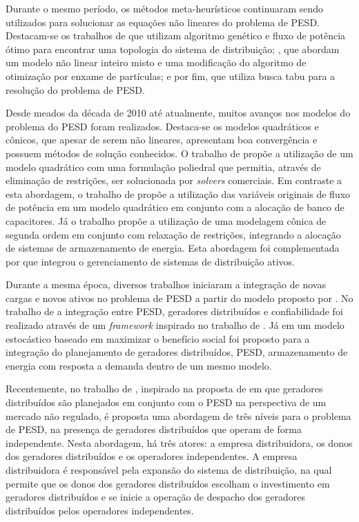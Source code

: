 Durante o mesmo período, os métodos meta-heurísticos continuaram sendo utilizados para solucionar as equações não lineares do problema de \ac{PESD}. Destacam-se os trabalhos de  que utilizam algoritmo genético e fluxo de potência ótimo para encontrar uma topologia do sistema de distribuição; , que abordam um modelo não linear inteiro misto e uma modificação do algoritmo de otimização por enxame de partículas; e por fim,  que utiliza busca tabu para a resolução do problema de \ac{PESD}.


Desde meados da década de 2010 até atualmente, muitos avanços nos modelos do problema do \ac{PESD} foram realizados. Destaca-se os modelos quadráticos e cônicos, que apesar de serem não lineares, apresentam boa convergência e possuem métodos de solução conhecidos. O trabalho de  propõe a utilização de um modelo quadrático com uma formulação poliedral que permitia, através de eliminação de restrições, ser solucionada por \textit{solvers} comerciais. Em contraste a esta abordagem, o trabalho de  propõe a utilização das variáveis originais de fluxo de potência em um modelo quadrático em conjunto com a alocação de banco de capacitores. Já o trabalho  propõe a utilização de uma modelagem cônica de segunda ordem em conjunto com relaxação de restrições, integrando a alocação de sistemas de armazenamento de energia. Esta abordagem foi complementada por  que integrou o gerenciamento de sistemas de distribuição ativos.


Durante a mesma época, diversos trabalhos iniciaram a integração de novas cargas e novos ativos no problema de \ac{PESD} a partir do modelo proposto por . No trabalho de  a integração entre \ac{PESD}, geradores distribuídos e confiabilidade foi realizado através de um \textit{framework} inspirado no trabalho de . Já em  um modelo estocástico baseado em maximizar o benefício social foi proposto para a integração do planejamento de geradores distribuídos, \ac{PESD}, armazenamento de energia com resposta a demanda dentro de um mesmo modelo. 

Recentemente, no trabalho de , inspirado na proposta de  em que geradores distribuídos são planejados em conjunto com o \ac{PESD} na perspectiva de um mercado não regulado, é proposta uma abordagem de três níveis para o problema de \ac{PESD}, na presença de geradores distribuídos que operam de forma independente. Nesta abordagem, há três atores: a empresa distribuidora, os donos dos geradores distribuídos e os operadores independentes. A empresa distribuidora é responsável pela expansão do sistema de distribuição, na qual permite que os donos dos geradores distribuídos escolham o investimento em geradores distribuídos e se inicie a operação de despacho dos geradores distribuídos pelos operadores independentes.

